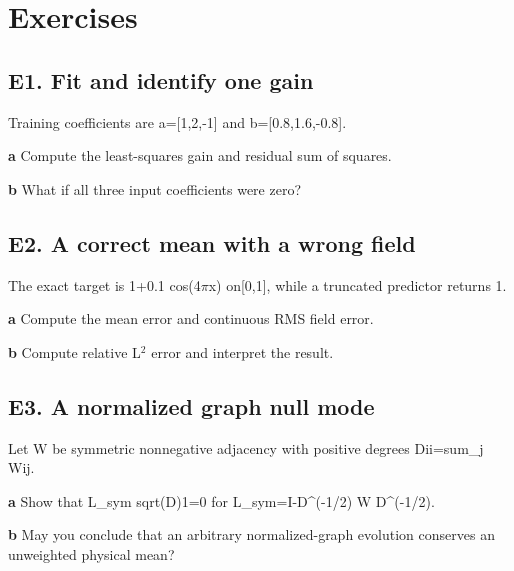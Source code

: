 \documentclass[11pt,letterpaper]{article}
\theoremstyle{definition}\newtheorem{definition}{Definition}\newtheorem{example}{Example}
\numberwithin{equation}{section}
\begin{document}
\section*{Exercises}
\par\noindent\begin{minipage}{\linewidth}
\subsection*{E1. Fit and identify one gain}
Training coefficients are a=\allowbreak{}[1,2,-1] and b=\allowbreak{}[0.8,1.6,-0.8].

\textbf{a} Compute the least-squares gain and residual sum of squares.

\end{minipage}\par\medskip
\textbf{b} What if all three input coefficients were zero?

\par\noindent\begin{minipage}{\linewidth}
\subsection*{E2. A correct mean with a wrong field}
The exact target is 1+\allowbreak{}0.1 cos(4$\pi$x) on[0,1], while a truncated predictor returns 1.

\textbf{a} Compute the mean error and continuous RMS field error.

\end{minipage}\par\medskip
\textbf{b} Compute relative L$^2$ error and interpret the result.

\par\noindent\begin{minipage}{\linewidth}
\subsection*{E3. A normalized graph null mode}
Let W be symmetric nonnegative adjacency with positive degrees Dii=\allowbreak{}sum\_j Wij.

\textbf{a} Show that L\_sym sqrt(D)1=\allowbreak{}0 for L\_sym=\allowbreak{}I-D\textasciicircum{}(-1/2) W D\textasciicircum{}(-1/2).

\end{minipage}\par\medskip
\textbf{b} May you conclude that an arbitrary normalized-graph evolution conserves an unweighted physical mean?
\end{document}
